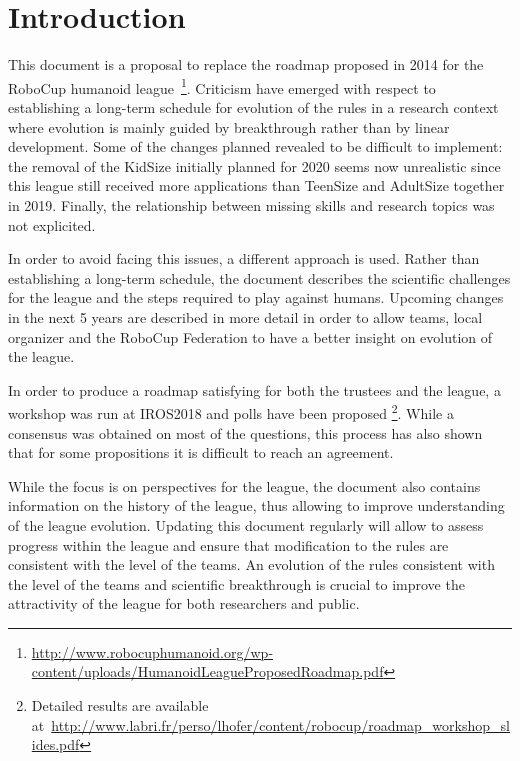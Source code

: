 \documentclass{article}
\begin{document}
\section{Introduction}

This document is a proposal to replace the roadmap proposed in 2014 for the
RoboCup humanoid
league~\footnote{\url{http://www.robocuphumanoid.org/wp-content/uploads/HumanoidLeagueProposedRoadmap.pdf}}. Criticism
have emerged with respect to establishing a long-term schedule for evolution of
the rules in a research context where evolution is mainly guided by breakthrough
rather than by linear development. Some of the changes planned revealed to be
difficult to implement: the removal of the KidSize initially planned for 2020
seems now unrealistic since this league still received more applications than
TeenSize and AdultSize together in 2019. Finally, the relationship between
missing skills and research topics was not explicited.

In order to avoid facing this issues, a different approach is used. Rather than
establishing a long-term schedule, the document describes the scientific challenges
for the league and the steps required to play against humans.
Upcoming changes in the next 5 years are described in more detail in order to allow
teams, local organizer and the RoboCup Federation to have a better insight on
evolution of the league.

In order to produce a roadmap satisfying for both the trustees and the league,
a workshop was run at IROS2018 and polls have been proposed%
\footnote{Detailed results are available at~\url{http://www.labri.fr/perso/lhofer/content/robocup/roadmap_workshop_slides.pdf}}.
While a consensus was obtained on most of the questions,
this process has also shown that for some propositions it is difficult to reach an agreement.

While the focus is on perspectives for the league,
the document also contains information on the history of the league,
thus allowing to improve understanding of the league evolution.
Updating this document regularly will allow to assess progress within the league
and ensure that modification to the rules are consistent with the level of the
teams.
An evolution of the rules consistent with the level of the teams and
scientific breakthrough is crucial to improve the attractivity of the league
for both researchers and public.
\end{document}
